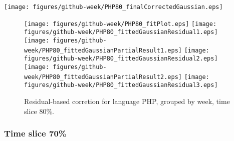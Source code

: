 \begin{center}
{\texttt{[image: figures/github-week/PHP80\_finalCorrectedGaussian.eps]}}
\end{center}

\FloatBarrier

\begin{figure}[t]
\centering
{}
{\texttt{[image: figures/github-week/PHP80\_fitPlot.eps]}}
{\texttt{[image: figures/github-week/PHP80\_fittedGaussianResidual1.eps]}}
{\texttt{[image: figures/github-week/PHP80\_fittedGaussianPartialResult1.eps]}}
{\texttt{[image: figures/github-week/PHP80\_fittedGaussianResidual2.eps]}}
{\texttt{[image: figures/github-week/PHP80\_fittedGaussianPartialResult2.eps]}}
{\texttt{[image: figures/github-week/PHP80\_fittedGaussianResidual3.eps]}}
\caption{Residual-based corretion for language PHP, grouped by week, time slice 80\%.}
\end{figure}


\FloatBarrier


\subsubsection{Time slice 70\%}

